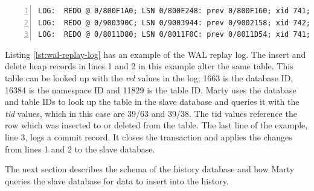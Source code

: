 \begin{lstlisting}[caption={WAL replay log example},label={lst:wal-replay-log},numbers=left,xleftmargin=2em]
LOG:  REDO @ 0/800F1A0; LSN 0/800F248: prev 0/800F160; xid 741; len 139: Heap - insert: rel 1663/16384/11829; tid 39/63
LOG:  REDO @ 0/900390C; LSN 0/9003944: prev 0/9002158; xid 742; len 26: Heap - delete: rel 1663/16384/11829; tid 39/38 KEYS_UPDATED
LOG:  REDO @ 0/8011D80; LSN 0/8011F0C: prev 0/8011D54; xid 741; len 368: Transaction - commit: 2014-03-06 23:36:33.937958+00; inval msgs: catcache 59 catcache 58 catcache 59 catcache 58 catcache 45 catcache 44 catcache 7 catcache 6 catcache 7 catcache 6 catcache 7 catcache 6 catcache 7 catcache 6 catcache 7 catcache 6 catcache 7 catcache 6 catcache 7 catcache 6 relcache 16394
\end{lstlisting}

Listing \ref{lst:wal-replay-log} has an example of the WAL replay log.
The insert and delete heap records in lines 1 and 2 in this example alter the same table.
This table can be looked up with the \textit{rel} values in the log; 1663 is the database ID, 16384 is the namespace ID and 11829 is the table ID.
Marty uses the database and table IDs to look up the table in the slave database and queries it with the \textit{tid} values, which in this case are 39/63 and 39/38.
The tid values reference the row which was inserted to or deleted from the table.
The last line of the example, line 3, logs a commit record.
It closes the transaction and applies the changes from lines 1 and 2 to the slave database.

The next section describes the schema of the history database and how Marty queries the slave database for data to insert into the history.